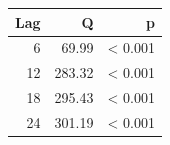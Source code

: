 
\begin{tabular}[t]{rrr}
\toprule
Lag & Q & p\\
\midrule
6 & 69.99 & < 0.001\\
12 & 283.32 & < 0.001\\
18 & 295.43 & < 0.001\\
24 & 301.19 & < 0.001\\
\bottomrule
\end{tabular}
